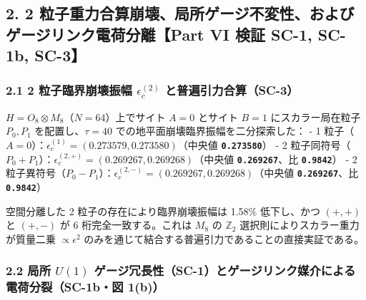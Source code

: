 \documentclass[
  a4paper,
]{ltjsarticle}
\begin{document}
\subsection{2. 2
粒子重力合算崩壊、局所ゲージ不変性、およびゲージリンク電荷分離【Part VI
検証 SC-1, SC-1b,
SC-3】}\label{ux7c92ux5b50ux91cdux529bux5408ux7b97ux5d29ux58caux5c40ux6240ux30b2ux30fcux30b8ux4e0dux5909ux6027ux304aux3088ux3073ux30b2ux30fcux30b8ux30eaux30f3ux30afux96fbux8377ux5206ux96e2part-vi-ux691cux8a3c-sc-1-sc-1b-sc-3}

\subsubsection{\texorpdfstring{2.1 2 粒子臨界崩壊振幅
\(\epsilon_c^{(2)}\)
と普遍引力合算（SC-3）}{2.1 2 粒子臨界崩壊振幅 \textbackslash epsilon\_c\^{}\{(2)\} と普遍引力合算（SC-3）}}\label{ux7c92ux5b50ux81e8ux754cux5d29ux58caux632fux5e45-epsilon_c2-ux3068ux666eux904dux5f15ux529bux5408ux7b97sc-3}

\(H = O_8 \otimes M_8\)（\(N=64\)）上でサイト \(A=0\) とサイト \(B=1\)
にスカラー局在粒子 \(P_0, P_1\) を配置し、\(\tau=40\)
での地平面崩壊臨界振幅を二分探索した： - 1
粒子（\(A=0\)）：\(\epsilon_c^{(1)} = (0.273579, 0.273580)\)（中央値
\textbf{\texttt{0.273580}}） - 2
粒子同符号（\(P_0 + P_1\)）：\(\epsilon_c^{(2,+)} = (0.269267, 0.269268)\)（中央値
\textbf{\texttt{0.269267}}、比 \textbf{\texttt{0.9842}}） - 2
粒子異符号（\(P_0 - P_1\)）：\(\epsilon_c^{(2,-)} = (0.269267, 0.269268)\)（中央値
\textbf{\texttt{0.269267}}、比 \textbf{\texttt{0.9842}}）

空間分離した 2 粒子の存在により臨界崩壊振幅は 1.58\% 低下し、かつ
\((+,+)\) と \((+,-)\) が 6 桁完全一致する。これは \(M_8\) の
\(\mathbb{Z}_2\) 選択則によりスカラー重力が質量二乗
\(\propto \epsilon^2\)
のみを通じて結合する普遍引力であることの直接実証である。

\subsubsection{\texorpdfstring{2.2 局所 \(U(1)\)
ゲージ冗長性（SC-1）とゲージリンク媒介による電荷分裂（SC-1b・図
1(b)）}{2.2 局所 U(1) ゲージ冗長性（SC-1）とゲージリンク媒介による電荷分裂（SC-1b・図 1(b)）}}\label{ux5c40ux6240-u1-ux30b2ux30fcux30b8ux5197ux9577ux6027sc-1ux3068ux30b2ux30fcux30b8ux30eaux30f3ux30afux5a92ux4ecbux306bux3088ux308bux96fbux8377ux5206ux88c2sc-1bux56f3-1b}
\end{document}
